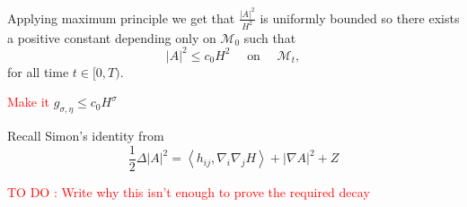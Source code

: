 Applying maximum principle we get that $ \frac{|A|^{2}}{H^{2}} $ is uniformly bounded so there exists a positive constant depending only on $ \mathcal{M}_{0} $ such that 
\[ |A|^{2} \le c_{0}H^{2} \quad \text{ on } \quad \mathcal{M}_{t}, \]
for all time $ t \in [0,T) $. 

\textcolor{red}{Make it} $ g_{\sigma, \eta }\le c_{0}H^{\sigma} $


Recall Simon's identity from \cite{huisken1984flow} \begin{equation}
        \frac{1}{2}\Delta |A|^{2} = \left< h_{ij}, \nabla_{i} \nabla_{j} H \right> + |\nabla A|^{2} + Z \label{Simonid}
\end{equation}

\textcolor{red}{TO DO : Write why this isn't enough to prove the required decay}

